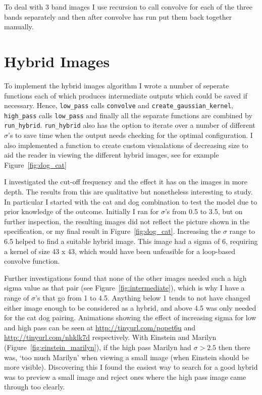 \documentclass[a4paper,10pt]{article}
\begin{document}
To deal with 3 band
images I use recursion to call convolve for each of the three bands separately
and then after convolve has run put them back together manually.

\section{Hybrid Images}
To implement the hybrid images algorithm I wrote a number of seperate
functions each of which produces intermediate outputs which could be
saved if necessary. Hence, \lstinline|low_pass| calls \lstinline|convolve| and
\lstinline|create_gaussian_kernel|, \lstinline|high_pass| calls \lstinline|low_pass|
and finally all the separate functions are combined by \lstinline|run_hybrid|.
\lstinline|run_hybrid| also has the option to iterate over a number of different
$\sigma$'s to save time when the output needs checking for the optimal
configuration. I also implemented a function to create custom visualations of
decreasing size to aid the reader in viewing the different hybrid images, see
for example Figure~\ref{fig:dog_cat}

I investigated the cut-off frequency and the effect it has on the images in more
depth. The results from this are qualitative but nonetheless
interesting to study. In particular I started with the cat and dog combination
to test the model due to prior knowledge of the outcome. Initially I ran for $\sigma$'s
from 0.5 to 3.5, but on further inspection, the resulting images did not
reflect the picture shown in the specification, or my final result in
Figure~\ref{fig:dog_cat}.
Increasing the $\sigma$ range to 6.5 helped to find a suitable hybrid image.
This image had a sigma of 6, requiring a kernel of size 43 x 43, which would
have been unfeasible for a loop-based convolve function.

Further investigations found that none of the other images needed
such a high sigma value as that pair (see Figure~\ref{fig:intermediate}), which is
why I have a range of $\sigma$'s
that go from 1 to 4.5. Anything below 1 tends to not have changed either image
enough to be considered as a hybrid, and above 4.5 was only needed for the cat
dog pairing. Animations showing the effect of increasing sigma for low and high pass can be
seen at \url{http://tinyurl.com/popet6u} and
\url{http://tinyurl.com/nhklk7d} respectively. With Einstein and Marilyn
(Figure~\ref{fig:einstein_marilyn}), if
the high pass Marilyn had $\sigma > 2.5$ then there was, `too much
Marilyn' when viewing a small image (when Einstein should be more visible).
Discovering this I found the easiest way to search for a good hybrid was to
preview a small image and reject ones where the high pass image came through too
clearly.
\end{document}
